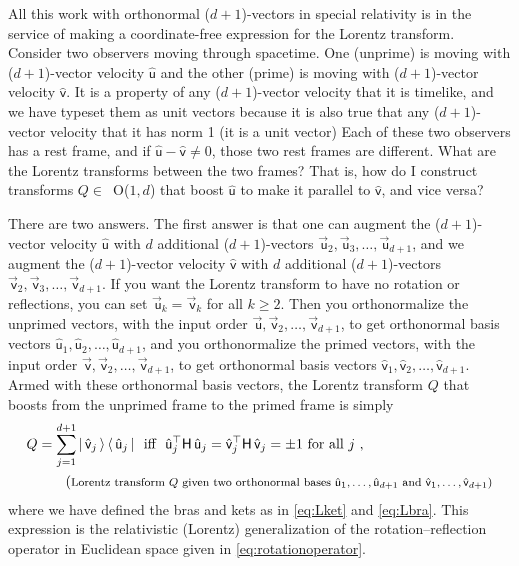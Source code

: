 \documentclass{article}
\newcommand{\metric}{\mathsf{H}}
\newcommand\upvec[1]{\!\vec{\,\mathrm{#1}}}
\newcommand{\Lvec}[1]{\upvec{\mathsf{#1}}} %
\newcommand{\Lhat}[1]{\hat{\mathsf{#1}}} %
\newcommand{\ketbra}[2]{|\,{#1}\,\rangle\,\langle\,{#2}\,|}
\newcommand{\plus}{\!+\!} %
\begin{document}
All this work with orthonormal ($d\plus1$)-vectors in special relativity is in the service of making a coordinate-free expression for the Lorentz transform.
Consider two observers moving through spacetime.
One (unprime) is moving with ($d\plus1$)-vector velocity $\Lhat{u}$ and the other (prime) is moving with ($d\plus1$)-vector velocity $\Lhat{v}$.
It is a property of any ($d\plus1$)-vector velocity that it is timelike, and we have typeset them as unit vectors because it is also true that any ($d\plus1$)-vector velocity that it has norm 1 (it is a unit vector)
Each of these two observers has a rest frame, and if $\Lhat{u}-\Lhat{v}\neq 0$, those two rest frames are different.
What are the Lorentz transforms between the two frames?
That is, how do I construct transforms $Q\in$~O($1,d$) that boost $\Lhat{u}$ to make it parallel to $\Lhat{v}$, and vice versa?

There are two answers.
The first answer is that one can augment the ($d\plus1$)-vector velocity $\Lhat{u}$ with $d$ additional ($d\plus1$)-vectors $\Lvec{u}_2,\Lvec{u}_3,\ldots,\Lvec{u}_{d+1}$, and we augment the ($d\plus1$)-vector velocity $\Lhat{v}$ with $d$ additional ($d\plus1$)-vectors $\Lvec{v}_2,\Lvec{v}_3,\ldots,\Lvec{v}_{d+1}$.
If you want the Lorentz transform to have no rotation or reflections, you can set $\Lvec{u}_k=\Lvec{v}_k$ for all $k\geq 2$.
Then you orthonormalize the unprimed vectors, with the input order $\Lvec{u},\Lvec{v}_2,\ldots,\Lvec{v}_{d+1}$, to get orthonormal basis vectors $\Lhat{u}_1,\Lhat{u}_2,\ldots,\Lhat{u}_{d+1}$, and you orthonormalize the primed vectors, with the input order $\Lvec{v},\Lvec{v}_2,\ldots,\Lvec{v}_{d+1}$, to get orthonormal basis vectors $\Lhat{v}_1,\Lhat{v}_2,\ldots,\Lhat{v}_{d+1}$.
Armed with these orthonormal basis vectors, the Lorentz transform $Q$ that boosts from the unprimed frame to the primed frame is simply
\begin{align}
  Q &= \sum_{j=1}^{d+1} \ketbra{\Lhat{v}_j}{\Lhat{u}_j} ~~ \mbox{iff} ~~ \Lhat{u}_j^\top\metric\,\Lhat{u}_j = \Lhat{v}_j^\top\metric\,\Lhat{v}_j = \pm 1 ~ \mbox{for all $j$} \label{eq:LTQM} ~, \\
  & \tag{\footnotesize Lorentz transform $Q$ given two orthonormal bases $\Lhat{u}_1,\ldots,\Lhat{u}_{d+1}$ and $\Lhat{v}_1,\ldots,\Lhat{v}_{d+1}$}
\end{align}
where we have defined the bras and kets as in \eqref{eq:Lket} and \eqref{eq:Lbra}.
This expression is the relativistic (Lorentz) generalization of the rotation--reflection operator in Euclidean space given in \eqref{eq:rotationoperator}.
\end{document}
